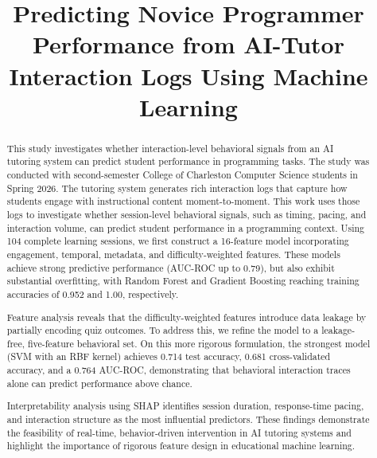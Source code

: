 \documentclass[conference]{IEEEtran}
\begin{document}
\renewcommand{\thesection}{\arabic{section}}
\renewcommand{\thesubsection}{\arabic{section}.\arabic{subsection}}
\renewcommand{\thetable}{\arabic{table}}
\renewcommand{\thefigure}{\arabic{figure}}



\title{Predicting Novice Programmer Performance from AI-Tutor Interaction Logs Using Machine Learning}

\author{
}

\maketitle

\begin{abstract}
This study investigates whether interaction-level behavioral signals from an AI tutoring system can predict student performance in programming tasks. The study was conducted with
second-semester College of Charleston Computer Science students in Spring
2026. The tutoring system generates rich interaction logs that capture how
students engage with instructional content moment-to-moment. This work
uses those logs to investigate whether session-level behavioral signals, 
such as timing, pacing, and interaction volume, can predict student
performance in a programming context. Using 104 complete learning
sessions, we first construct a 16-feature model incorporating engagement,
temporal, metadata, and difficulty-weighted features. These models achieve
strong predictive performance (AUC-ROC up to 0.79), but also exhibit
substantial overfitting, with Random Forest and Gradient Boosting reaching
training accuracies of 0.952 and 1.00, respectively.

Feature analysis reveals that the difficulty-weighted features introduce
data leakage by partially encoding quiz outcomes. To address this, we
refine the model to a leakage-free, five-feature behavioral set. On this
more rigorous formulation, the strongest model (SVM with an RBF kernel)
achieves 0.714 test accuracy, 0.681 cross-validated accuracy, and a
0.764 AUC-ROC, demonstrating that behavioral interaction traces alone can
predict performance above chance.

Interpretability analysis using SHAP identifies session duration, response-time pacing, and interaction structure as the most influential predictors. These findings demonstrate the feasibility of real-time, behavior-driven intervention in AI tutoring systems and highlight the importance of rigorous feature design in educational machine learning.

\end{abstract}
\end{document}
